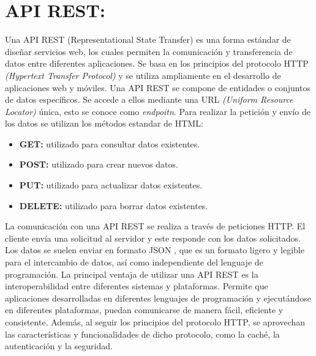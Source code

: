\section{API REST:}
Una API REST \cite{wiki:api_rest} (Representational State Transfer) es una forma estándar de diseñar servicios web, los cuales permiten la comunicación y transferencia de datos entre diferentes aplicaciones. Se basa en los principios del protocolo HTTP \textit{(Hypertext Transfer Protocol)} y se utiliza ampliamente en el desarrollo de aplicaciones web y móviles.
Una API REST se compone de entidades o conjuntos de datos específicos. Se accede a ellos mediante una URL \textit{(Uniform Resource Locator)} única, esto se conoce como \textit{endpoitn}. Para realizar la petición y envío de los datos se utilizan los métodos estandar de HTML:
\begin{itemize}
    \item \textbf{GET:} utilizado para consultar datos existentes.
    \item \textbf{POST:} utilizado para crear nuevos datos.
    \item \textbf{PUT:} utilizado para actualizar datos existentes.
    \item \textbf{DELETE:} utilizado para borrar datos existentes.
\end{itemize}
La comunicación con una API REST se realiza a través de peticiones HTTP. El cliente envía una solicitud al servidor y este responde con los datos solicitados. Los datos se suelen enviar en formato JSON , que es un formato ligero y legible para el intercambio de datos, así como independiente del lenguaje de programación.
La principal ventaja de utilizar una API REST es la interoperabilidad entre diferentes sistemas y plataformas. Permite que aplicaciones desarrolladas en diferentes lenguajes de programación y ejecutándose en diferentes plataformas, puedan comunicarse de manera fácil, eficiente y consistente. Además, al seguir los principios del protocolo HTTP, se aprovechan las características y funcionalidades de dicho protocolo, como la caché, la autenticación y la seguridad.
